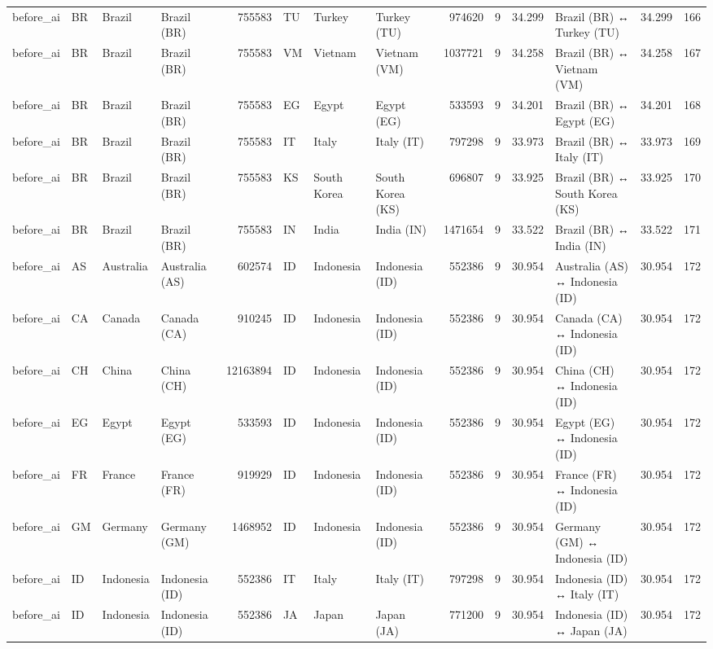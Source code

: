 \begin{tabular}{llllrlllrrrlrr}
before\_ai & BR & Brazil & Brazil (BR) & 755583 & TU & Turkey & Turkey (TU) & 974620 & 9 & 34.299 & Brazil (BR) ↔ Turkey (TU) & 34.299 & 166 \\
before\_ai & BR & Brazil & Brazil (BR) & 755583 & VM & Vietnam & Vietnam (VM) & 1037721 & 9 & 34.258 & Brazil (BR) ↔ Vietnam (VM) & 34.258 & 167 \\
before\_ai & BR & Brazil & Brazil (BR) & 755583 & EG & Egypt & Egypt (EG) & 533593 & 9 & 34.201 & Brazil (BR) ↔ Egypt (EG) & 34.201 & 168 \\
before\_ai & BR & Brazil & Brazil (BR) & 755583 & IT & Italy & Italy (IT) & 797298 & 9 & 33.973 & Brazil (BR) ↔ Italy (IT) & 33.973 & 169 \\
before\_ai & BR & Brazil & Brazil (BR) & 755583 & KS & South Korea & South Korea (KS) & 696807 & 9 & 33.925 & Brazil (BR) ↔ South Korea (KS) & 33.925 & 170 \\
before\_ai & BR & Brazil & Brazil (BR) & 755583 & IN & India & India (IN) & 1471654 & 9 & 33.522 & Brazil (BR) ↔ India (IN) & 33.522 & 171 \\
before\_ai & AS & Australia & Australia (AS) & 602574 & ID & Indonesia & Indonesia (ID) & 552386 & 9 & 30.954 & Australia (AS) ↔ Indonesia (ID) & 30.954 & 172 \\
before\_ai & CA & Canada & Canada (CA) & 910245 & ID & Indonesia & Indonesia (ID) & 552386 & 9 & 30.954 & Canada (CA) ↔ Indonesia (ID) & 30.954 & 172 \\
before\_ai & CH & China & China (CH) & 12163894 & ID & Indonesia & Indonesia (ID) & 552386 & 9 & 30.954 & China (CH) ↔ Indonesia (ID) & 30.954 & 172 \\
before\_ai & EG & Egypt & Egypt (EG) & 533593 & ID & Indonesia & Indonesia (ID) & 552386 & 9 & 30.954 & Egypt (EG) ↔ Indonesia (ID) & 30.954 & 172 \\
before\_ai & FR & France & France (FR) & 919929 & ID & Indonesia & Indonesia (ID) & 552386 & 9 & 30.954 & France (FR) ↔ Indonesia (ID) & 30.954 & 172 \\
before\_ai & GM & Germany & Germany (GM) & 1468952 & ID & Indonesia & Indonesia (ID) & 552386 & 9 & 30.954 & Germany (GM) ↔ Indonesia (ID) & 30.954 & 172 \\
before\_ai & ID & Indonesia & Indonesia (ID) & 552386 & IT & Italy & Italy (IT) & 797298 & 9 & 30.954 & Indonesia (ID) ↔ Italy (IT) & 30.954 & 172 \\
before\_ai & ID & Indonesia & Indonesia (ID) & 552386 & JA & Japan & Japan (JA) & 771200 & 9 & 30.954 & Indonesia (ID) ↔ Japan (JA) & 30.954 & 172 \\

\end{tabular}
